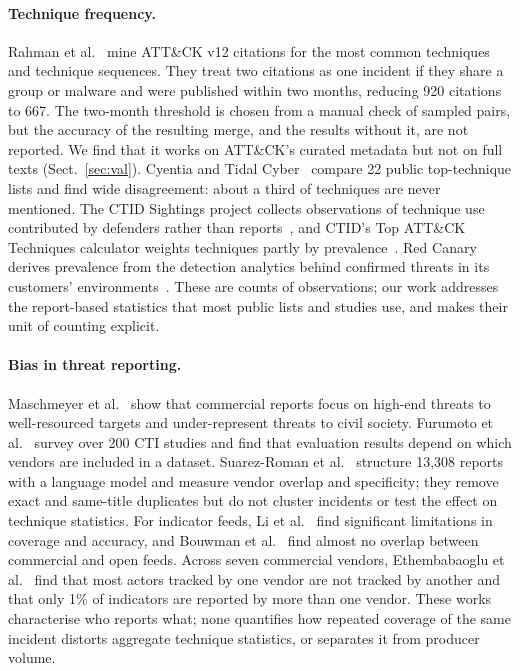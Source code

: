 \documentclass[runningheads]{llncs}
\newcommand{\attack}{ATT\&CK}
\begin{document}
\paragraph{Technique frequency.} Rahman et al.~\cite{rahman2024arsenal} mine \attack{} v12 citations for the most common techniques and technique sequences. They treat two citations as one incident if they share a group or malware and were published within two months, reducing 920 citations to 667. The two-month threshold is chosen from a manual check of sampled pairs, but the accuracy of the resulting merge, and the results without it, are not reported. We find that it works on \attack{}'s curated metadata but not on full texts (Sect.~\ref{sec:val}). Cyentia and Tidal Cyber~\cite{cyentia2023multisource} compare 22 public top-technique lists and find wide disagreement: about a third of techniques are never mentioned. The CTID Sightings project collects observations of technique use contributed by defenders rather than reports~\cite{ctid2021sightings}, and CTID's Top \attack{} Techniques calculator weights techniques partly by prevalence~\cite{ctid2022top}. Red Canary derives prevalence from the detection analytics behind confirmed threats in its customers' environments~\cite{redcanary2026tdr}. These are counts of observations; our work addresses the report-based statistics that most public lists and studies use, and makes their unit of counting explicit.

\paragraph{Bias in threat reporting.} Maschmeyer et al.~\cite{maschmeyer2021tale} show that commercial reports focus on high-end threats to well-resourced targets and under-represent threats to civil society. Furumoto et al.~\cite{furumoto2025survey} survey over 200 CTI studies and find that evaluation results depend on which vendors are included in a dataset. Suarez-Roman et al.~\cite{suarezroman2026echo} structure 13,308 reports with a language model and measure vendor overlap and specificity; they remove exact and same-title duplicates but do not cluster incidents or test the effect on technique statistics. For indicator feeds, Li et al.~\cite{li2019tealeaves} find significant limitations in coverage and accuracy, and Bouwman et al.~\cite{bouwman2020cup} find almost no overlap between commercial and open feeds. Across seven commercial vendors, Ethembabaoglu et al.~\cite{ethembabaoglu2026apt} find that most actors tracked by one vendor are not tracked by another and that only 1\% of indicators are reported by more than one vendor. These works characterise who reports what; none quantifies how repeated coverage of the same incident distorts aggregate technique statistics, or separates it from producer volume.
\end{document}

